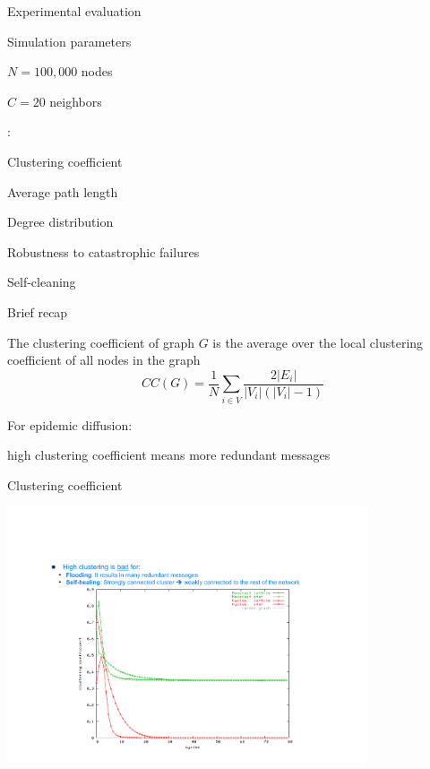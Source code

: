 \begin{frame}{Experimental evaluation}

\begin{block}{Simulation parameters}
\BI
\item $N=100,000$ nodes
\item $C=20$ neighbors
\EI
\end{block}

\bigskip
{}:
\BI
\item Clustering coefficient
\item Average path length
\item Degree distribution
\item Robustness to catastrophic failures
\item Self-cleaning
\EI

\end{frame}

\begin{frame}{Brief recap}

\begin{definition}

The \alert{clustering coefficient} of graph $G$ is the average over the local 
  clustering coefficient of all nodes in the graph
  \[
     CC(G) = \frac{1}{N} \sum_{i \in V} \frac{2|E_i|}{|V_i|(|V_i|-1)}
  \]
\end{definition}

\bigskip
For epidemic diffusion:
\BI
\item high clustering coefficient means more redundant messages
\EI

\end{frame}

\begin{frame}{Clustering coefficient}
	
\begin{center}
\includegraphics[width=0.8\textwidth]{clustering}	
\end{center}
	

	
\end{frame}


